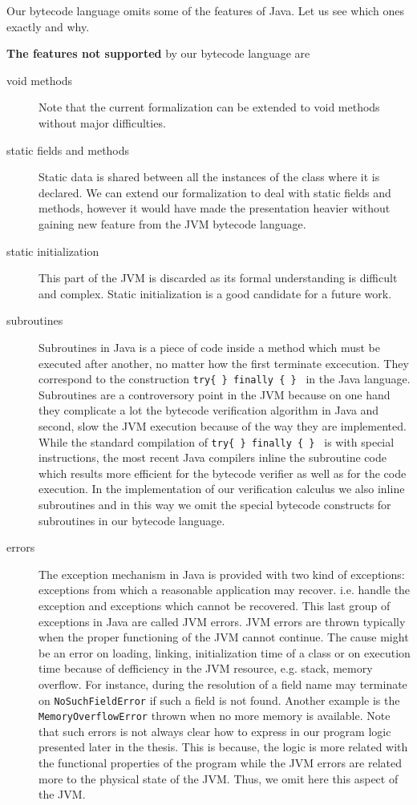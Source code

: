  Our bytecode language omits some of the features of Java. Let us see which ones exactly and why.

\textbf{The features not supported} by our bytecode language are 
\begin{description} 
   \item[void methods]  Note that the current formalization can be extended to void methods without major difficulties.

   \item [static fields and methods] Static data is shared between all the instances of the class
         where it is declared.  We can extend our formalization to deal with static fields and methods,
	 however it would have made the presentation heavier without gaining new feature from the JVM bytecode language. 

   \item [static initialization] This part of the JVM is discarded as its formal understanding is difficult and complex.
         Static initialization is a good candidate for a future work. 

   \item [subroutines] Subroutines in Java is a piece of code inside a method which must be executed 
         after another, no matter how the first terminate excecution. 
	 They correspond to the construction \texttt{try\{ \} finally \{ \} } in the Java language.
	 Subroutines are a controversory point 
	 in the JVM because on one hand they complicate a lot the bytecode verification algorithm in Java and second,
	 slow the JVM execution because of the way they are implemented. While the standard compilation of  \texttt{try\{ \} finally \{ \} }
	 is with special instructions, the most recent Java compilers inline the subroutine 
	 code which results more efficient for the bytecode verifier as well as for the code execution. 
	 In the implementation of our verification calculus we also inline subroutines and in this way we omit the special bytecode constructs
	 for subroutines in our bytecode language. 
	
  
  \item [errors] The exception mechanism in Java is provided with two kind of exceptions: exceptions from which 
        a reasonable application may recover. i.e. handle the exception and exceptions which cannot be recovered. This last group
	of exceptions in Java are called JVM errors. JVM errors are  thrown typically when the proper functioning of the JVM cannot 
	continue. 
	The cause might be an error  on loading, linking, initialization time of a class or on execution time because of defficiency in the JVM resource, e.g.
	stack, memory overflow.
	For instance, during the resolution of a field name may terminate on \texttt{NoSuchFieldError} if 
	such a field is not found. Another example is the \texttt{MemoryOverflowError} thrown when no more memory is available.
	Note that such errors is not always clear how to express in our program logic presented later in the thesis. This is because, 
	the logic is more related with the functional properties of the program while the JVM errors are related more to the physical
	state of the JVM. Thus, we omit here this aspect of the JVM.
	 


\end{description}
